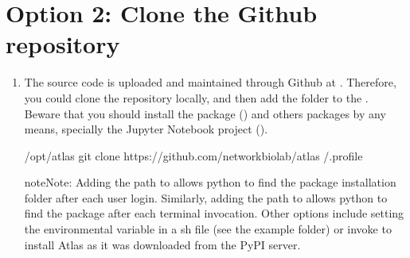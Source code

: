 \documentclass[letterpaper,10pt,english]{sphinxmanual}
\begin{document}
\section{Option 2: Clone the Github repository}
\label{\detokenize{Installation:option-2-clone-the-github-repository}}\begin{enumerate}
%
\item {} 

The source code is uploaded and maintained through Github at
. Therefore, you could clone the
repository locally, and then add the folder to the . Beware
that you should install the  package () and others packages
by any means, specially the Jupyter Notebook project ().

\begin{sphinxVerbatim}[commandchars=\\\{\}]
/opt/atlas
git clone https://github.com/networkbiolab/atlas 
   \PYGZgt{}\PYGZgt{} /.profile
\end{sphinxVerbatim}

\begin{sphinxadmonition}{note}{Note:}
Adding the path to  allows python to find the package
installation folder after each user login. Similarly, adding the path to
 allows python to find the package after each terminal
invocation. Other options include setting the  environmental
variable in a sh file (see the example folder) or invoke 
to install Atlas as it was downloaded from the PyPI server.
\end{sphinxadmonition}

\end{enumerate}
\end{document}
